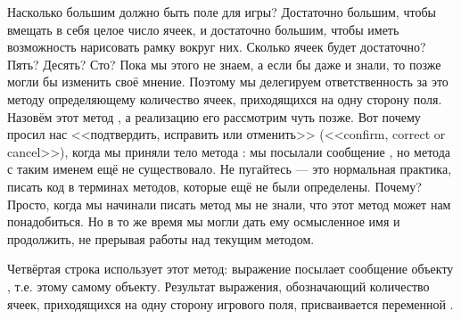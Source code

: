 \documentclass[a4paper,10pt,twoside]{book}
\begin{document}
{%
Насколько большим должно быть поле для игры? Достаточно большим, чтобы вмещать в себя целое число ячеек, и достаточно большим, чтобы иметь возможность нарисовать рамку вокруг них.
Сколько ячеек будет достаточно? Пять? Десять? Сто? Пока мы этого не знаем, а если бы даже и знали, то позже могли бы изменить своё мнение. Поэтому мы делегируем ответственность за это методу определяющему количество ячеек, приходящихся на одну сторону поля. Назовём этот метод , а реализацию его рассмотрим чуть позже.
Вот почему \pahro просил нас <<подтвердить, исправить или отменить>> (<<confirm, correct or cancel>>), когда мы приняли тело метода : мы посылали сообщение , но метода с таким именем ещё не существовало.
Не пугайтесь --- это нормальная практика, писать код в терминах методов, которые ещё не были определены.
Почему? Просто, когда мы начинали писать метод  мы не знали, что этот метод может нам понадобиться. Но в то же время мы могли дать ему осмысленное имя и продолжить, не прерывая работы над текущим методом.
 
Четвёртая строка использует этот метод:
выражение  посылает сообщение  объекту , т.е. этому самому объекту.
Результат выражения, обозначающий количество ячеек, приходящихся на одну сторону игрового поля, присваивается переменной .

}
\end{document}
